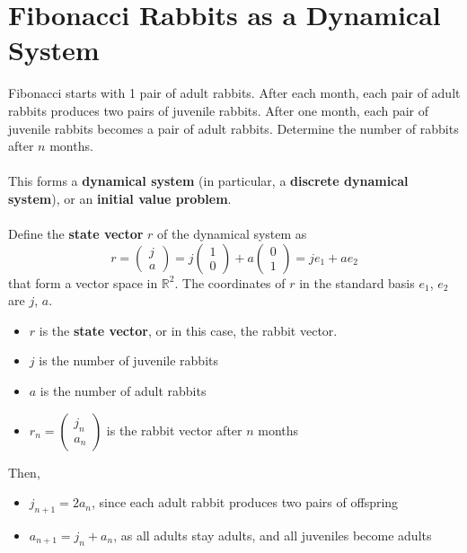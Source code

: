 \documentclass[letterpaper,12pt]{article}
\begin{document}
\section*{Fibonacci Rabbits as a Dynamical System}
Fibonacci starts with 1 pair of adult rabbits. After each month, each pair of adult rabbits produces two pairs of juvenile rabbits. After one month, each pair of juvenile rabbits becomes a pair of adult rabbits. Determine the number of rabbits after $n$ months.
\\ \\ This forms a \textbf{dynamical system} (in particular, a \textbf{discrete dynamical system}), or an \textbf{initial value problem}.
\\ \\ Define the \textbf{state vector} $r$ of the dynamical system as
\begin{equation*}
    r = \begin{pmatrix} j \\ a \end{pmatrix} = j \begin{pmatrix} 1 \\ 0 \end{pmatrix} + a \begin{pmatrix} 0 \\ 1 \end{pmatrix} = j e_1 + a e_2
\end{equation*}
that form a vector space in $\mathbb{R}^2$. The coordinates of $r$ in the standard basis $e_1$, $e_2$ are $j$, $a$.
\begin{itemize}
    \item $r$ is the \textbf{state vector}, or in this case, the rabbit vector.
    \item $j$ is the number of juvenile rabbits
    \item $a$ is the number of adult rabbits
    \item $r_n = \begin{pmatrix} j_n \\ a_n \end{pmatrix}$ is the rabbit vector after $n$ months
\end{itemize}
Then,
\begin{itemize}
    \item $j_{n+1} = 2a_n$, since each adult rabbit produces two pairs of offspring
    \item $a_{n+1} = j_n + a_n$, as all adults stay adults, and all juveniles become adults
\end{itemize}
\end{document}
